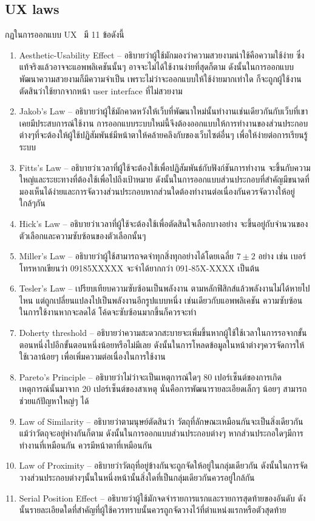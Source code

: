 \subsection{UX laws}
\label{subsec:uxlaws}
กฏในการออกแบบ UX~\cite{uxui} มี 11 ข้อดังนี้
\begin{enumerate}
  \item Aesthetic-Usability Effect -- อธิบายว่าผู้ใช้มักมองว่าความสวยงามน่าใช้คือความใช้ง่าย 
      ซึ่งแท้จริงแล้วอาจจะแอพพลิเคชันนั้นๆ อาจจะไม่ได้ใช้งานง่ายที่สุดก็ตาม ดังนั้นในการออกแบบพัฒนาความสวยงามก็มีความจำเป็น
      เพราะไม่ว่าจะออกแบบให้ใช้ง่ายมากเท่าใด ก็จะถูกผู้ใช้งานตัดสินว่าใช้ยากจากหน้า user interface ที่ไม่สวยงาม
  \item Jakob's Law -- อธิบายว่าผู้ใช้มักคาดหวังให้เว็บที่พัฒนาใหม่นั้นทำงานเช่นเดียวกันกับเว็บที่เขาเคยมีประสบการณ์ใช้งาน
        การออกแบบระบบใหม่นี้จึงต้องออกแบบให้การทำงานของส่วนประกอบต่างๆที่จะต้องให้ผู้ใช้ปฏิสัมพันธ์มีหน้าตาให้คล้ายคลึงกับของเว็บไซต์อื่นๆ
        เพื่อให้ง่ายต่อการเรียนรู้ระบบ
  \item Fitts's Law -- อธิบายว่าเวลาที่ผู้ใช้จะต้องใช้เพื่อปฏิสัมพันธ์กับฟังก์ชันการทำงาน จะขึ้นกับความใหญ่และระยะทางที่ต้องใช้เพื่อไปถึงเป้าหมาย
        ดังนั้นในการออกแบบส่วนประกอบที่สำคัญมีขนาดที่มองเห็นได้ง่ายและการจัดวางส่วนประกอบหากส่วนใดต้องทำงานต่อเนื่องกันควรจัดวางให้อยู่ใกล้ๆกัน
  \item Hick's Law -- อธิบายว่าเวลาที่ผู้ใช้จะต้องใช้เพื่อตัดสินใจเลือกบางอย่าง จะขึ้นอยู่กับจำนวนของตัวเลือกและความซับซ้อนของตัวเลือกนั้นๆ
  \item Miller's Law -- อธิบายว่าผู้ใช้สามารถจดจำทุกสิ่งทุกอย่างได้โดยเฉลี่ย $7\pm2$ อย่าง 
        เช่น เบอร์โทรหากเขียนว่า 09185XXXXX จะจำได้ยากกว่า 091-85X-XXXX เป็นต้น
  \item Tesler's Law -- เปรียบเทียบความซับซ้อนเป็นพลังงาน ตามหลักฟิสิกส์แล้วพลังงานไม่ได้หายไปไหน 
        แต่ถูกเปลี่ยนแปลงไปเป็นพลังงานอีกรูปแบบหนึ่ง เช่นเดียวกับแอพพลิเคชัน ความซับซ้อนในการใช้งานหากจะลดได้ 
        โค้ดจะซับซ้อนมากขึ้นก็ควรจะทำ
  \item Doherty threshold -- อธิบายว่าความสะดวกสะบายจะเพิ่มขึ้นหากผู้ใช้ใช้เวลาในการรอจากขั้นตอนหนึ่งไปอีกขั้นตอนหนึ่งน้อยหรือไม่มีเลย 
        ดังนั้นในการโหลดข้อมูลในหน้าต่างๆควรจัดการให้ใช้เวลาน้อยๆ เพื่อเพิ่มความต่อเนื่องในการใช้งาน
  \item Pareto's  Principle -- อธิบายว่าไม่ว่าจะเป็นเหตุการณ์ใดๆ 80 เปอร์เซ็นต์ของการเกิดเหตุการณ์นั้นมาจาก 20 เปอร์เซ็นต์ของสาเหตุ 
        นั่นคือการพัฒนารายละเอียดเล็กๆ น้อยๆ สามารถช่วยแก้ปัญหาใหญ่ๆ ได้
  \item Law of Similarity -- อธิบายว่าตามนุษย์ตัดสินว่า วัตถุที่ลักษณะเหมือนกันจะเป็นสิ่งเดียวกัน แม้ว่าวัตถุจะอยู่ห่างกันก็ตาม
        ดังนั้นในการออกแบบส่วนประกอบต่างๆ หากส่วนประกอใดๆมีการทำงานที่เหมือนกัน ควรมีหน้าตาที่เหมือนกัน
  \item Law of Proximity -- อธิบายว่าวัตถุที่อยู่ข้างกันจะถูกจัดให้อยู่ในกลุ่มเดียวกัน 
        ดังนั้นในการจัดวางส่วนประกอบต่างๆนั้นในหนึ่งหน้านั้นสิ่งใดที่เป็นกลุ่มเดียวกันควรอยู่ใกล้กัน
  \item Serial Position Effect -- อธิบายว่าผู้ใช้มักจดจำรายการแรกและรายการสุดท้ายของอันดับ
        ดังนั้นรายละเอียดใดที่สำคัญที่ผู้ใช้ควรทราบนั้นควรถูกจัดวางไว้ที่ตำแหน่งแรกหรือตัวสุดท้าย
\end{enumerate}
